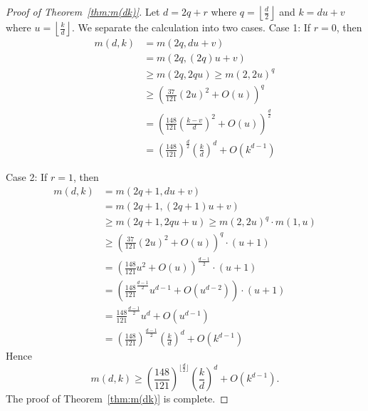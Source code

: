 \documentclass[11pt]{article}
\theoremstyle{definition}
\begin{document}
\begin{proof}[Proof of Theorem~\ref{thm:m(dk)}]
Let $d = 2q +r$ where $q =\displaystyle\left \lfloor \frac{d}{2}\right\rfloor$ and $k = du +v$ where $u =\displaystyle \left \lfloor \frac{k}{d}\right\rfloor$. We separate the calculation into two cases.
Case 1: If $r = 0$, then
\begin{align*}
m(d,k) &= m(2q, du +v)\\
&= m(2q, (2q)u +v)\\
&\geq m(2q, 2qu) \geq m(2, 2u)^q\\
&\geq \left(\frac{37}{121}(2u)^2+ O(u)\right)^q \\
&= \left(\frac{148}{121} \left(\frac{k-v}{d}\right) ^2+ O(u)\right)^{ \frac{d}{2}}\\
&= \left(\frac{148}{121}\right)^{ \frac{d}{2}}\left(\frac{k}{d}\right)^d + O(k^{d-1})
\end{align*}

Case 2: If $r = 1$, then
\begin{align*}
m(d,k) &= m(2q+1, du +v)\\
&= m(2q+1, (2q+1)u +v)\\
&\geq m(2q+1, 2qu + u) \geq m(2, 2u)^q \cdot m(1,u)\\
&\geq \left(\frac{37}{121}(2u)^2+ O(u)\right)^q \cdot (u+1) \\
&= \left(\frac{148}{121} u^2 + O(u)\right)^{ \frac{d-1}{2}} \cdot (u+1)\\
&= \left(\frac{148}{121}^{ \frac{d-1}{2}} u ^{d-1}+ O(u^{d-2})\right) \cdot (u+1)\\
&= \frac{148}{121}^{ \frac{d-1}{2}} u ^{d}+ O(u^{d-1})\\
&= \left(\frac{148}{121}\right)^{ \frac{d-1}{2}}\left(\frac{k}{d}\right)^d + O(k^{d-1})
\end{align*}
Hence 
\[
m(d,k) \geq \left(\frac{148}{121}\right)^{\lfloor \frac{d}{2}\rfloor}\left(\frac{k}{d}\right)^d + O(k^{d-1}).
\]
The proof of Theorem~\ref{thm:m(dk)} is complete.
\end{proof}





\end{document}

